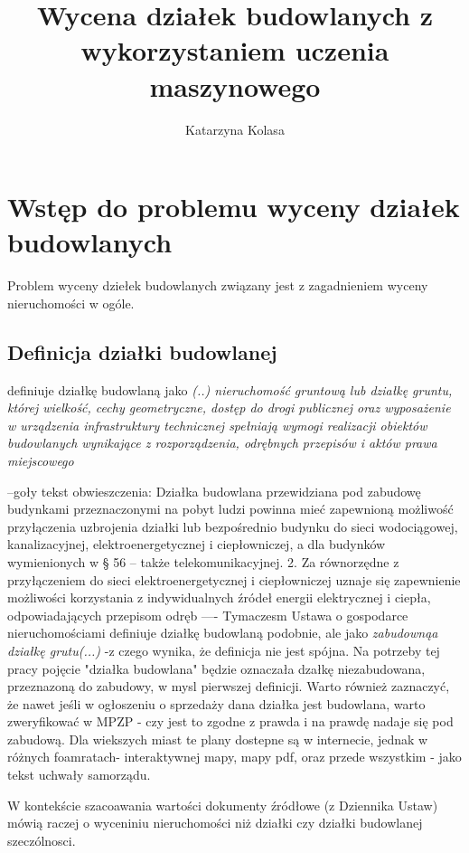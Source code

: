 \documentclass[a4paper,12pt,twoside,openany]{report}
\title{Wycena działek budowlanych z wykorzystaniem uczenia maszynowego}
\author{Katarzyna Kolasa}
\begin{document}
\maketitle

\chapter{Wstęp do problemu wyceny działek budowlanych}
Problem wyceny dziełek budowlanych związany jest z zagadnieniem wyceny nieruchomości w ogóle. 

\section{Definicja działki budowlanej}
 definiuje działkę budowlaną jako
\textit{(..) nieruchomość gruntową lub działkę gruntu, której wielkość, cechy geometryczne, dostęp do drogi publicznej oraz wyposażenie w urządzenia infrastruktury technicznej spełniają wymogi realizacji obiektów budowlanych wynikające z rozporządzenia, odrębnych przepisów i aktów prawa miejscowego}\cite{OMI}


--goły tekst obwieszczenia:
 Działka budowlana przewidziana pod zabudowę budynkami przeznaczonymi na pobyt ludzi powinna mieć zapewnioną możliwość przyłączenia uzbrojenia działki lub bezpośrednio budynku do sieci wodociągowej, kanalizacyjnej, elektroenergetycznej i ciepłowniczej, a dla budynków wymienionych w § 56 – także telekomunikacyjnej. 2. Za równorzędne z przyłączeniem do sieci elektroenergetycznej i ciepłowniczej uznaje się zapewnienie możliwości korzystania  z indywidualnych  źródeł  energii  elektrycznej  i ciepła,  odpowiadających  przepisom  odręb
----
Tymaczesm Ustawa o gospodarce nieruchomościami  definiuje działkę budowlaną podobnie, ale jako \textit {zabudownąa działkę grutu(...)} -z czego wynika, że definicja nie jest spójna. Na potrzeby tej pracy pojęcie "działka budowlana" będzie oznaczała dzałkę niezabudowana, przeznazoną do zabudowy, w mysl pierwszej definicji.
Warto również zaznaczyć, że nawet jeśli w ogłoszeniu o sprzedaży dana działka jest budowlana, warto zweryfikować w  MPZP -  czy jest to zgodne z prawda i na prawdę nadaje się pod zabudową. Dla wiekszych miast te plany dostepne są w internecie, jednak w różnych foamratach- interaktywnej mapy, mapy pdf, oraz przede wszystkim - jako tekst uchwały samorządu. 


W kontekście szacoawania wartości dokumenty źródłowe (z Dziennika Ustaw) mówią raczej o wyceniniu nieruchomości niż działki czy działki budowlanej szeczólnosci.
\end{document}
